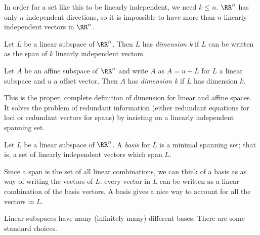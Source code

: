 \documentclass[fleqn]{report}
\begin{document}
In order for a set like this to be linearly independent, we need
$k \leq n$. $\RR^n$ has only $n$ independent directions, so it
is impossible to have more than $n$ linearly
independent vectors in $\RR^n$. 

\begin{defn}
Let $L$ be a linear subspace of $\RR^n$. Then $L$ has
\emph{dimension k} if $L$ can be written as the span of $k$
linearly independent vectors. 
\end{defn}

\begin{defn}
Let $A$ be an affine subspace of $\RR^n$ and
write $A$ as $A = u + L$ for $L$ a linear subspace and $u$ a
offset vector. Then $A$ has \emph{dimension k} if $L$ has
dimension $k$.
\end{defn}

This is the proper, complete definition of dimension for linear
and affine spaces. It solves the problem of redundant
information (either redundant equations for loci or redundant
vectors for spans) by insisting on a linearly independent
spanning set. 

\begin{defn}
Let $L$ be a linear subspace of $\RR^n$. A \emph{basis} for $L$
is a minimal spanning set; that is, a set of linearly
independent vectors which span $L$. 
\end{defn}

Since a span is the set of all linear combinations, we can think
of a basis as as way of writing the vectors of $L$: every vector
in $L$ can be written as a linear combination of the basis
vectors. A basis gives a nice way to account for all the
vectors in $L$.

Linear subspaces have many (infinitely many) different bases.
There are some standard choices.
\end{document}
